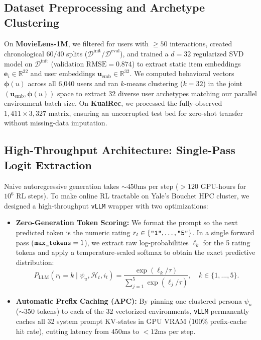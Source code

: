 \documentclass{article}
\begin{document}
\subsection{Dataset Preprocessing and Archetype Clustering}
On \textbf{MovieLens-1M}, we filtered for users with $\ge 50$ interactions, created chronological $60/40$ splits ($\mathcal{D}^{\text{init}} / \mathcal{D}^{\text{eval}}$), and trained a $d=32$ regularized SVD model on $\mathcal{D}^{\text{init}}$ (validation $\text{RMSE} = 0.874$) to extract static item embeddings $\bm{e}_i \in \mathbb{R}^{32}$ and user embeddings $\bm{u}_{\text{emb}} \in \mathbb{R}^{32}$. We computed behavioral vectors $\bm{\phi}(u)$ across all 6,040 users and ran $k$-means clustering ($k=32$) in the joint $(\bm{u}_{\text{emb}}, \bm{\phi}(u))$ space to extract 32 diverse user archetypes matching our parallel environment batch size. On \textbf{KuaiRec}, we processed the fully-observed $1,411 \times 3,327$ matrix, ensuring an uncorrupted test bed for zero-shot transfer without missing-data imputation.

\subsection{High-Throughput Architecture: Single-Pass Logit Extraction}
Naive autoregressive generation takes $\sim 450\text{ms}$ per step ($>120$ GPU-hours for $10^6$ RL steps). To make online RL tractable on Yale's Bouchet HPC cluster, we designed a high-throughput \texttt{vLLM} wrapper with two optimizations:
\begin{itemize}
    \item \textbf{Zero-Generation Token Scoring:} We format the prompt so the next predicted token is the numeric rating $r_t \in \{\text{\texttt{"1"}}, \dots, \text{\texttt{"5"}}\}$. In a single forward pass ($\text{\texttt{max\_tokens}}=1$), we extract raw log-probabilities $\ell_k$ for the 5 rating tokens and apply a temperature-scaled softmax to obtain the exact predictive distribution:
    \begin{equation}
        P_{\text{LLM}}(r_t = k \mid \psi_u, \mathcal{H}_t, i_t) = \frac{\exp(\ell_k / \tau)}{\sum_{j=1}^5 \exp(\ell_j / \tau)}, \quad k \in \{1,\dots,5\}.
    \end{equation}
    \item \textbf{Automatic Prefix Caching (APC):} By pinning one clustered persona $\psi_u$ ($\sim 350$ tokens) to each of the 32 vectorized environments, \texttt{vLLM} permanently caches all 32 system prompt KV-states in GPU VRAM ($100\%$ prefix-cache hit rate), cutting latency from $450\text{ms}$ to $<12\text{ms}$ per step.
\end{itemize}
\end{document}
